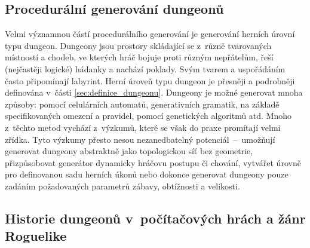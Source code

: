 
\subsection{Procedurální generování dungeonů}


Velmi významnou částí procedurálního generování je generování herních úrovní typu dungeon.
Dungeony jsou prostory skládající se z~různě tvarovaných místností a chodeb, ve kterých hráč bojuje proti různým nepřátelům, řeší (nejčastěji logické) hádanky a nachází poklady.
Svým tvarem a uspořádáním často připomínají labyrint.
Herní úroveň typu dungeon je přesněji a podrobněji definována v~části \ref{sec:definice_dungeonu}.
Dungeony je možné generovat mnoha způsoby: pomocí celulárních automatů, generativních gramatik, na základě specifikovaných omezení a pravidel, pomocí genetických algoritmů atd.
Mnoho z~těchto metod vychází z~výzkumů, které se však do praxe promítají velmi zřídka.
Tyto výzkumy přesto nesou nezanedbatelný potenciál~--~umožňují generovat dungeony abstraktně jako topologickou síť bez geometrie, přizpůsobovat generátor dynamicky hráčovu postupu či chování, vytvářet úrovně  pro definovanou sadu herních úkonů nebo dokonce generovat dungeony pouze zadáním požadovaných parametrů zábavy, obtížnosti a velikosti.


\subsection{Historie dungeonů v~počítačových hrách a žánr Roguelike}
\label{ssec:historie_dungeonu_a_roguelike}


